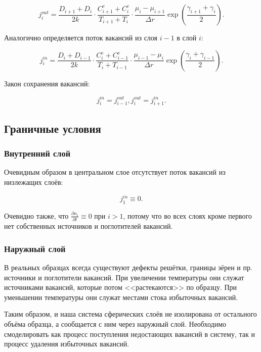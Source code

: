 \documentclass[12pt, a4paper]{article}
\begin{document}
\begin{equation}
\label{eq_j_out}
\boxed{
j_i^{out}=\frac{D_{i+1} + D_i}{2k} \cdot \frac{C^e_{i+1} + C^e_i}{T_{i+1} + T_i} \cdot \frac{\mu_i - \mu_{i+1} }{\Delta r} \exp(\frac{\gamma_{i + 1} + \gamma_i}{2}).
}
\end{equation}

Аналогично определяется поток вакансий из слоя $i-1$ в слой $i$:

\begin{equation}
\boxed{
j_i^{in}=\frac{D_i + D_{i-1}}{2k} \cdot \frac{C^e_i + C^e_{i-1}}{T_i + T_{i-1}} \cdot \frac{\mu_{i-1} - \mu_i}{\Delta r} \exp(\frac{\gamma_i + \gamma_{i-1}}{2}).
}
\end{equation}

Закон сохранения вакансий:

\begin{equation}
j_i^{in}=j_{i-1}^{out}, j_i^{out}=j_{i+1}^{in}.
\end{equation}

\subsection{Граничные условия}

\subsubsection{Внутренний слой}

Очевидным образом в центральном слое отсутствует поток вакансий из низлежащих слоёв:

\begin{equation}
j_1^{in} \equiv 0.
\end{equation}

Очевидно также, что $\frac{\partial n_i}{\partial t} \equiv 0$ при $i > 1$, потому что во всех слоях кроме первого нет собственных источников и поглотителей вакансий.

\subsubsection{Наружный слой}

В реальных образцах всегда существуют дефекты решётки, границы зёрен и пр. источники и поглотители вакансий. При увеличении температуры они служат источниками вакансий, которые потом <<растекаются>> по образцу. При уменьшении температуры они служат местами стока избыточных вакансий.

Таким образом, и наша система сферических слоёв не изолирована от остального объёма образца, а сообщается с ним через наружный слой. Необходимо смоделировать как процесс поступления недостающих вакансий в систему, так и процесс удаления избыточных вакансий.
\end{document}
